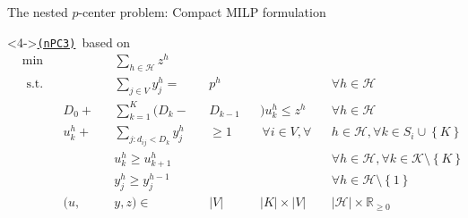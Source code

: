 \documentclass[utf8,aspectratio=169,ngerman,english]{beamer}
\newcommand{\nPCE}{\hyperref[eq:nPCE]{\texttt{(nPC3)}}\xspace}
\newcommand{\inH}{h \in \mathcal H}
\begin{document}
\begin{frame}{The nested $p$-center problem: Compact MILP formulation}
\begin{minipage}[t]{0.59\linewidth}
        \begin{block}<4->{\nPCE\ based on \cite{Elloumi2018}}
            \vspace*{-10pt}
            \begin{subequations}\label{eq:nPCE}
                \begin{alignat*}{9}
                     & \min         &  &           &  & \sum_{\inH}z^{h}            &  &         &  &                           &  &                                                                                    \\
                     & \text{ s.t.} &  &           &  & \sum_{j \in V}y_{j}^h =     &  & p^{h}   &  &                           &  & \forall \inH                                                                       \\
                     &              &  & D_0 +     &  & \sum_{k=1}^{K} (D_k-        &  & D_{k-1} &  & )u^{h}_k \leq z^h \;      &  & \forall h \in \mathcal{H}                                                          \\
                     &              &  & u^{h}_k + &  & \sum_{j:d_{ij}<D_k} y_{j}^h &  & \geq 1  &  & \,\forall i \in V,\forall &  & h \in \mathcal H, \forall k \in S_i \cup \left \{K \right \}                       \\
                     &              &  &           &  & u^{h}_k \geq u_{k+1}^h      &  &         &  &                           &  & \forall h \in \mathcal{H}, \forall k \in \mathcal{K} \setminus \left \{K \right \} \\
                     &              &  &           &  & y_{j}^h \geq y_j^{h-1}      &  &         &  &                           &  & \forall \inH \setminus \left \{1 \right \}                                         \\
                     &              &  & (u,       &  & y,z) \in                    &  & |V|     &  & |K| \times |V|            &  & |\mathcal H| \times \mathbb{R}_{\geq 0}
                \end{alignat*}
            \end{subequations}
        \end{block}
    \end{minipage}
\end{frame}





\end{document}
